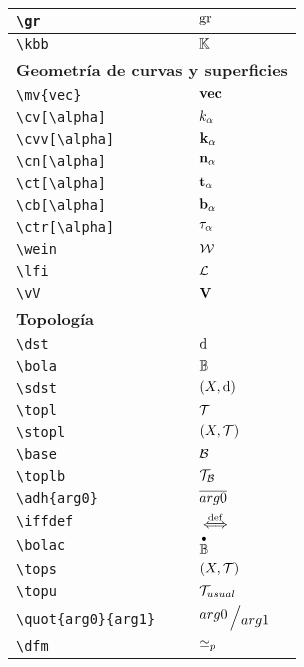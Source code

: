 \begin{longtable}{|p{3.5cm}|p{2cm}|}
\verb|\gr| & $\displaystyle\gr$ \\ \midrule 
\verb|\kbb| & $\displaystyle\kbb$ \\ \midrule 
\bottomrule \multicolumn{2}{|p{5.5cm}|}{\textbf{Geometría de curvas y superficies}} \\ \toprule 
\verb|\mv{vec}| & $\displaystyle\mv{vec}$ \\ \midrule 
\verb|\cv[\alpha]| & $\displaystyle\cv[\alpha]$ \\ \midrule 
\verb|\cvv[\alpha]| & $\displaystyle\cvv[\alpha]$ \\ \midrule 
\verb|\cn[\alpha]| & $\displaystyle\cn[\alpha]$ \\ \midrule 
\verb|\ct[\alpha]| & $\displaystyle\ct[\alpha]$ \\ \midrule 
\verb|\cb[\alpha]| & $\displaystyle\cb[\alpha]$ \\ \midrule 
\verb|\ctr[\alpha]| & $\displaystyle\ctr[\alpha]$ \\ \midrule 
\verb|\wein| & $\displaystyle\wein$ \\ \midrule 
\verb|\lfi| & $\displaystyle\lfi$ \\ \midrule 
\verb|\vV| & $\displaystyle\vV$ \\ \midrule 
\bottomrule \multicolumn{2}{|p{5.5cm}|}{\textbf{Topología}} \\ \toprule 
\verb|\dst| & $\displaystyle\dst$ \\ \midrule 
\verb|\bola| & $\displaystyle\bola$ \\ \midrule 
\verb|\sdst| & $\displaystyle\sdst$ \\ \midrule 
\verb|\topl| & $\displaystyle\topl$ \\ \midrule 
\verb|\stopl| & $\displaystyle\stopl$ \\ \midrule 
\verb|\base| & $\displaystyle\base$ \\ \midrule 
\verb|\toplb| & $\displaystyle\toplb$ \\ \midrule 
\verb|\adh{arg0}| & $\displaystyle\adh{arg0}$ \\ \midrule 
\verb|\iffdef| & $\displaystyle\iffdef$ \\ \midrule 
\verb|\bolac| & $\displaystyle\bolac$ \\ \midrule 
\verb|\tops| & $\displaystyle\tops$ \\ \midrule 
\verb|\topu| & $\displaystyle\topu$ \\ \midrule 
\verb|\quot{arg0}{arg1}| & $\displaystyle\quot{arg0}{arg1}$ \\ \midrule 
\verb|\dfm| & $\displaystyle\dfm$ \\ \midrule 

\end{longtable}
